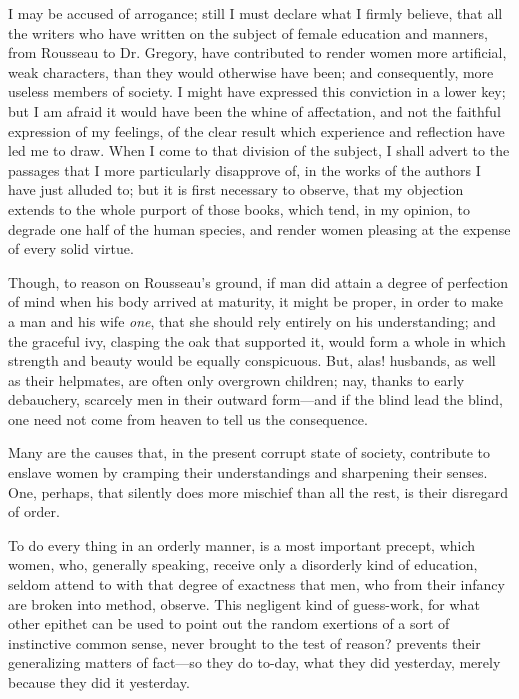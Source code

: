 I may be accused of arrogance; still I must declare what I firmly
believe, that all the writers who have written on the subject of
female education and manners, from Rousseau to Dr. Gregory, have
contributed to render women more artificial, weak characters, than
they would otherwise have been; and consequently, more useless members
of society. I might have expressed this conviction in a lower key; but
I am afraid it would have  been the whine of affectation, and
not the faithful expression of my feelings, of the clear result which
experience and reflection have led me to draw. When I come to that
division of the subject, I shall advert to the passages that I more
particularly disapprove of, in the works of the authors I have just
alluded to; but it is first necessary to observe, that my objection
extends to the whole purport of those books, which tend, in my
opinion, to degrade one half of the human species, and render women
pleasing at the expense of every solid virtue.

Though, to reason on Rousseau's ground, if man did attain a degree of
perfection of mind when his body arrived at maturity, it might be
proper, in order to make a man and his wife \textit{one}, that she
should rely entirely on his understanding; and the graceful ivy,
clasping the oak that supported it, would form a whole in which
strength and beauty would be equally conspicuous. But, alas! husbands,
as well as their helpmates, are often only overgrown children; nay,
thanks to early debauchery, scarcely men in their outward form---and
if the blind lead the blind, one need not come from heaven to tell us
the consequence.

Many are the causes that, in the present corrupt state of
society, contribute to enslave women by cramping their understandings
and sharpening their senses. One, perhaps, that silently does more
mischief than all the rest, is their disregard of order.

To do every thing in an orderly manner, is a most important precept,
which women, who, generally speaking, receive only a disorderly kind
of education, seldom attend to with that degree of exactness that men,
who from their infancy are broken into method, observe. This negligent
kind of guess-work, for what other epithet can be used to point out
the random exertions of a sort of instinctive common sense, never
brought to the test of reason? prevents their generalizing matters of
fact---so they do to-day, what they did yesterday, merely because they
did it yesterday.

